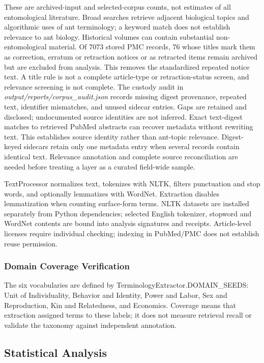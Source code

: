 \documentclass[
]{article}
\numberwithin{equation}{section}
\begin{document}
These are archived-input and selected-corpus counts, not estimates of
all entomological literature. Broad searches retrieve adjacent
biological topics and algorithmic uses of ant terminology; a keyword
match does not establish relevance to ant biology. Historical volumes
can contain substantial non-entomological material. Of 7073 stored PMC
records, 76 whose titles mark them as correction, erratum or retraction
notices or as retracted items remain archived but are excluded from
analysis. This removes the standardized repeated notice text. A title
rule is not a complete article-type or retraction-status screen, and
relevance screening is not complete. The custody audit in
\emph{output/reports/corpus\_audit.json} records missing digest
provenance, repeated text, identifier mismatches, and unused sidecar
entries. Gaps are retained and disclosed; undocumented source identities
are not inferred. Exact text-digest matches to retrieved PubMed
abstracts can recover metadata without rewriting text. This establishes
source identity rather than ant-topic relevance. Digest-keyed sidecars
retain only one metadata entry when several records contain identical
text. Relevance annotation and complete source reconciliation are needed
before treating a layer as a curated field-wide sample.

TextProcessor normalizes text, tokenizes with NLTK, filters punctuation
and stop words, and optionally lemmatizes with WordNet. Extraction
disables lemmatization when counting surface-form terms. NLTK datasets
are installed separately from Python dependencies; selected English
tokenizer, stopword and WordNet contents are bound into analysis
signatures and receipts. Article-level licenses require individual
checking; indexing in PubMed/PMC does not establish reuse permission.

\subsubsection{Domain Coverage
Verification}\label{domain-coverage-verification}

The six vocabularies are defined by TerminologyExtractor.DOMAIN\_SEEDS:
Unit of Individuality, Behavior and Identity, Power and Labor, Sex and
Reproduction, Kin and Relatedness, and Economics. Coverage means that
extraction assigned terms to these labels; it does not measure retrieval
recall or validate the taxonomy against independent annotation.

\subsection{Statistical Analysis}\label{sec:statistical_analysis}
\end{document}
